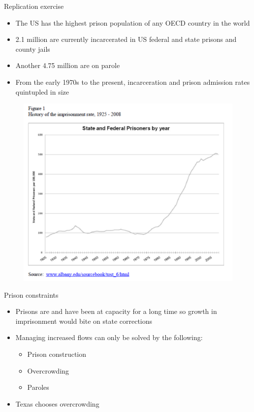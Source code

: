 \documentclass{beamer}
\begin{document}
\begin{frame}{Replication exercise}
	
	\begin{itemize}
	\item The US has the highest prison population of any OECD country in the world 
	\item 2.1 million are currently incarcerated in US federal and state prisons and county jails
	\item Another 4.75 million are on parole
	\item From the early 1970s to the present, incarceration and prison admission rates quintupled in size
	\end{itemize}
\end{frame}



\begin{frame}[plain]

\begin{figure}
\includegraphics[scale=0.5]{./lecture_includes/cook2010.pdf}
\end{figure}
\end{frame}


\begin{frame}{Prison constraints}

	
	\begin{itemize}
	\item Prisons are and have been at capacity for a long time so growth in imprisonment would bite on state corrections
	\item Managing increased flows can only be solved by the following:
		\begin{itemize}
		\item Prison construction
		\item Overcrowding
		\item Paroles
		\end{itemize}
	\item Texas chooses overcrowding
	\end{itemize}
\end{frame}
\end{document}
